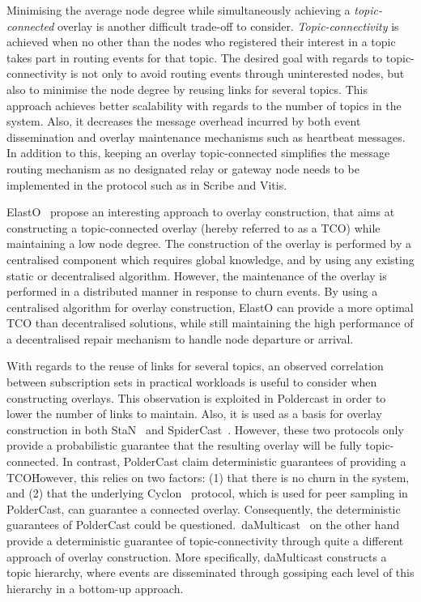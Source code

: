 Minimising the average node degree while simultaneously achieving a
\emph{topic-connected} overlay is another difficult trade-off to
consider. \emph{Topic-connectivity} is achieved when no other than the
nodes who registered their interest in a topic takes part in routing
events for that topic. The desired goal with regards to
topic-connectivity is not only to avoid routing events through
uninterested nodes, but also to minimise the node degree by reusing
links for several topics. This approach achieves better scalability with
regards to the number of topics in the system.  Also, it decreases the
message overhead incurred by both event dissemination and overlay
maintenance mechanisms such as heartbeat messages. In addition to this,
keeping an overlay topic-connected simplifies the message routing
mechanism as no designated relay or gateway node needs to be implemented
in the protocol such as in Scribe and Vitis.

ElastO~\cite{Chen:2013} propose an interesting approach to overlay construction,
that aims at constructing a topic-connected overlay (hereby referred to
as a TCO) while maintaining a
low node degree. The construction of the overlay is performed by a centralised
component which requires global knowledge, and by using any existing static or
decentralised algorithm. However, the maintenance of the overlay is
performed in a distributed manner in response to churn events. By using
a centralised algorithm for overlay construction, ElastO can provide a
more optimal TCO than decentralised solutions, while still maintaining
the high performance of a decentralised repair mechanism to handle node
departure or arrival.

With regards to the reuse of links for several topics, an observed
correlation~\cite{Liu:2005} between subscription sets in practical
workloads is useful to consider when constructing overlays. This
observation is exploited in Poldercast in order to lower the number of
links to maintain. Also, it is used as a basis for overlay construction
in both StaN~\cite{Matos:2010} and SpiderCast~\cite{Chockler:2007}.
However, these two protocols only provide a probabilistic guarantee that
the resulting overlay will be fully topic-connected. In contrast,
PolderCast claim deterministic guarantees of providing a TCO\. However,
this relies on two factors: (1) that there is no churn in the system,
and (2) that the underlying Cyclon~\cite{Voulgaris:2005} protocol, which
is used for peer sampling in PolderCast, can guarantee a connected
overlay.  Consequently, the deterministic guarantees of PolderCast could
be questioned.\ daMulticast~\cite{Baehni:2004} on the other hand provide
a deterministic guarantee of topic-connectivity through quite a
different approach of overlay construction. More specifically,
daMulticast constructs a topic hierarchy, where events are disseminated
through gossiping each level of this hierarchy in a bottom-up approach.

